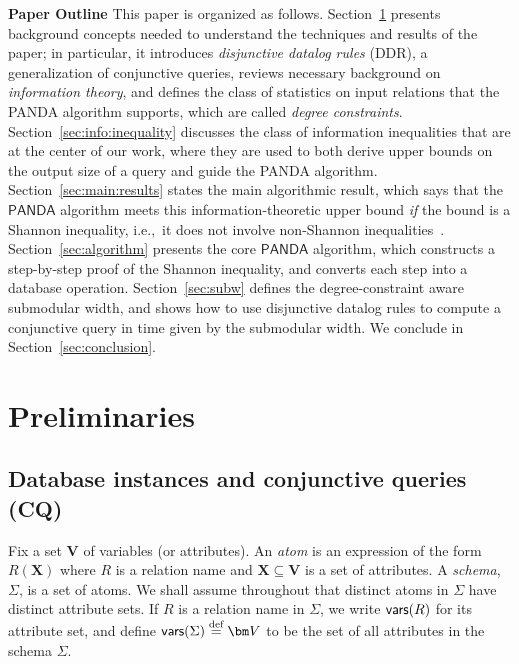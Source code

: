\documentclass{theoretics}
\newcommand{\defeq}{\stackrel{\text{def}}{=}}
\newcommand{\vars}{\text{\sf vars}}
\newcommand{\panda}{\textsf{PANDA}\xspace}
\begin{document}
{\bf Paper Outline} This paper is organized as follows. Section~\ref{sec:prelim} presents
background concepts needed to understand the techniques and results of the paper; in
particular, it introduces {\em disjunctive datalog rules} (DDR), a generalization of
conjunctive queries, reviews necessary background on {\em information theory},  and defines
the class of statistics on input relations that the \panda algorithm supports, which are
called {\em degree constraints}. Section~\ref{sec:info:inequality} discusses the class of
information inequalities that are at the center of our work, where they are used to
both derive upper bounds on the output size of a query and guide the \panda algorithm.
Section~\ref{sec:main:results} states the main algorithmic result, which says that the
$\panda$ algorithm meets this information-theoretic upper bound {\em if} the bound is a
Shannon inequality, i.e.,~it does not involve non-Shannon
inequalities~\cite{DBLP:journals/tit/ZhangY97,zhang1998characterization}.
Section~\ref{sec:algorithm} presents the core $\panda$ algorithm, which constructs a
step-by-step proof of the Shannon inequality, and converts each step into a database
operation. Section~\ref{sec:subw} defines the degree-constraint aware submodular width, and
shows how to use disjunctive datalog rules to compute a conjunctive query in time given by
the submodular width.  We conclude in Section~\ref{sec:conclusion}.


\section{Preliminaries}
\label{sec:prelim}

\subsection{Database instances and conjunctive queries (CQ)}
\label{subsec:conjunctive}

Fix a set $\bm V$ of variables (or attributes).  An {\em atom} is an expression of the form
$R(\bm X)$ where $R$ is a relation name and $\bm X \subseteq \bm V$ is a set of attributes.
A {\em schema}, $\Sigma$, is a set of atoms.  We shall assume throughout that distinct atoms
in $\Sigma$ have distinct attribute sets. If $R$ is a relation name in $\Sigma$, we write
$\vars(R)$ for its attribute set, and define $\vars(\Sigma)\defeq \bm V$ to be the
set of all attributes in the schema $\Sigma$.
\end{document}
